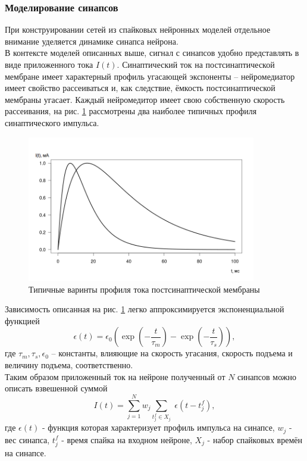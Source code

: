 \documentclass[a4paper,10pt]{article}
\begin{document}
\subsubsection{Моделирование синапсов}\label{sec:sim_mod}
\indent При конструировании сетей из спайковых нейронных моделей отдельное внимание уделяется динамике синапса нейрона.\\ 
\indent В контексте моделей описанных выше, сигнал с синапсов удобно представлять в виде приложенного тока $I(t)$. Синаптический ток на постсинаптической мембране имеет характерный профиль угасающей экспоненты -- нейромедиатор имеет свойство рассеиваться и, как следствие, ёмкость постсинаптической мембраны угасает. Каждый нейромедитор имеет свою собственную скорость рассеивания, на рис. \ref{syn_exp_pic} рассмотрены два наиболее типичных профиля синаптического импульса.
\begin{figure}[ht]
\centering
\captionsetup{justification=centering,margin=1cm}
\includegraphics[width=100mm,scale=1]{syn_exp.png}
\caption{Типичные варинты профиля тока постсинаптической мембраны}
\label{syn_exp_pic}
\end{figure}
\FloatBarrier
Зависимость описанная на рис. \ref{syn_exp_pic} легко аппроксимируется экспоненциальной функцией 
\begin{equation}\label{eq:epsp}
\epsilon(t) =	\epsilon_0\left(\exp\left(-\frac{t}{\tau_{m}}\right)-\exp\left(-\frac{t}{\tau_{s}}\right)\right),
\end{equation}
где $\tau_m, \tau_s, \epsilon_{0}$ -- константы, влияющие на скорость угасания, скорость подъема и величину подъема, соответственно.\\
\indent Таким образом приложенный ток на нейроне полученный от $N$ синапсов можно описать взвешенной суммой
\begin{equation}\label{eq:iaf_syn}
I(t) = \sum_{j=1}^{N} w_{j} \sum_{t_{j}^{f}\in X_{j}} \; \epsilon(t-t_{j}^{f}),
\end{equation}
где $\epsilon(t)$ - функция которая характеризует профиль импульса на синапсе, $w_{j}$ - вес синапса, $t_{j}^{f}$ - время спайка на входном нейроне, $X_{j}$ - набор спайковых времён на синапсе.\\
\end{document}
